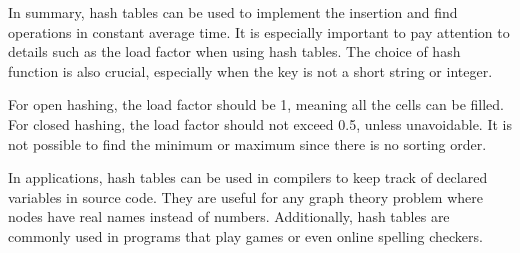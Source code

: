 In summary, hash tables can be used to implement the insertion and find operations in constant average time. It is especially important to pay attention to details such as the load factor when using hash tables. The choice of hash function is also crucial, especially when the key is not a short string or integer. 

For open hashing, the load factor should be 1, meaning all the cells can be filled. For closed hashing, the load factor should not exceed 0.5, unless unavoidable. It is not possible to find the minimum or maximum since there is no sorting order. 

In applications, hash tables can be used in compilers to keep track of declared variables in source code. They are useful for any graph theory problem where nodes have real names instead of numbers. Additionally, hash tables are commonly used in programs that play games or even online spelling checkers.
